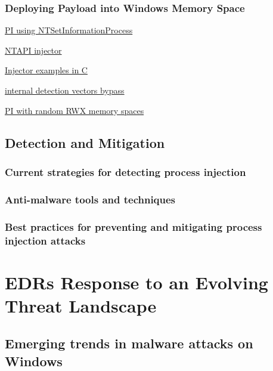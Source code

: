 \documentclass{article}
\newcommand{\outlinecite}[1]{\citetitle{#1} \textcite{#1}}
\begin{document}
\subsubsection{Deploying Payload into Windows Memory Space}

\outlinecite{Zhan:2018}

\href{https://www.riskinsight-wavestone.com/en/2023/10/process-injection-using-ntsetinformationprocess/}{PI using NTSetInformationProcess}

\href{https://github.com/elddy/Windows-NTAPI-Injector}{NTAPI injector} 

\href{https://gist.github.com/WKL-Sec/96e17188e4c159c2cdf7ff2c111130cc#file-local-c}{Injector examples in C}

\href{https://www.unknowncheats.me/forum/anti-cheat-bypass/286274-internal-detection-vectors-bypass.html}{internal detection vectors bypass}

\href{https://medium.com/@s12deff/process-injection-with-random-rwx-memory-spaces-3e3651149527}{PI with random RWX memory spaces}

\subsection{Detection and Mitigation}

\subsubsection{Current strategies for detecting process injection}

\subsubsection{Anti-malware tools and techniques}

\subsubsection{Best practices for preventing and mitigating process injection attacks}

\section{EDRs Response to an Evolving Threat Landscape}

\outlinecite{Hayes:2023}

\subsection{Emerging trends in malware attacks on Windows}
\end{document}
